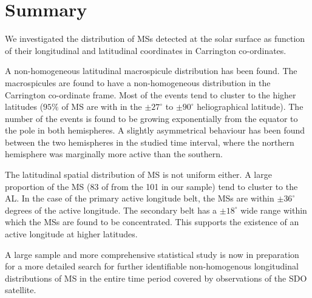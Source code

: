 \section{Summary}
We investigated the distribution of MSs detected at the solar surface as function of their longitudinal and latitudinal coordinates in Carrington co-ordinates.

A non-homogeneous latitudinal macrospicule distribution has been found. 
The macrospicules are found to have a non-homogeneous distribution in the Carrington co-ordinate frame.  
Most of the events tend to cluster to the higher latitudes ($95\%$ of MS are with in the $\pm27^{\circ}$ to $\pm90^{\circ}$ heliographical latitude).
The number of the events is found to be growing exponentially from the equator to the pole in both hemispheres. 
A slightly asymmetrical behaviour has been found between the two hemispheres in the studied time interval, where the northern hemisphere was marginally more active than the southern. 

The latitudinal spatial distribution of MS is not uniform either. A large proportion of the MS (83 of from the 101 in our sample) tend to cluster to the AL.
In the case of the primary active longitude belt, the MSs are within $\pm 36^{\circ}$ degrees of the active longitude.
The secondary belt has a $\pm 18^{\circ}$ wide range within which the MSs are found to be concentrated.
This supports the existence of an active longitude at higher latitudes.

A large sample and more comprehensive statistical study is now in preparation for a more detailed search for further identifiable non-homogenous longitudinal distributions of MS in the entire time period covered by observations of the SDO satellite.
